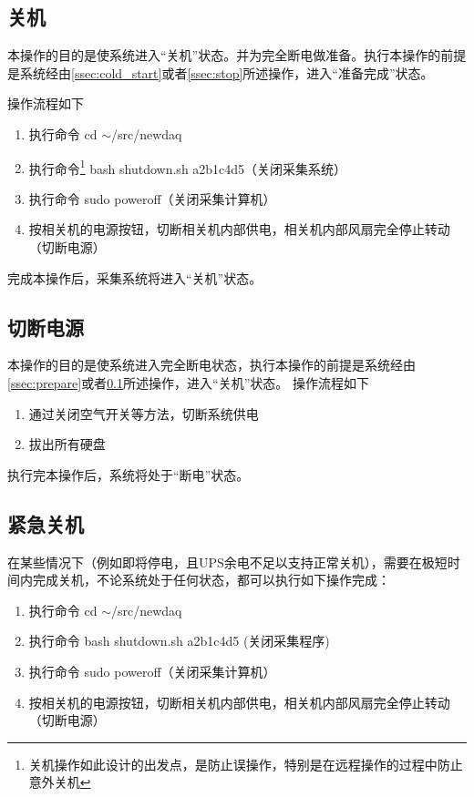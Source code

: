 \documentclass[11pt,includemp,a4paper]{article}
\begin{document}
\subsection{关机}
\label{ssec:shutdown}
本操作的目的是使系统进入“关机”状态。并为完全断电做准备。执行本操作的前提是系统经由\ref{ssec:cold_start}或者\ref{ssec:stop}所述操作，进入“准备完成”状态。

操作流程如下
\begin{enumerate}
    \item 执行命令 cd $\sim$/src/newdaq
    \item 执行命令\footnote{关机操作如此设计的出发点，是防止误操作，特别是在远程操作的过程中防止意外关机} bash shutdown.sh a2b1c4d5（关闭采集系统）
    \item 执行命令 sudo poweroff（关闭采集计算机）
    \item 按相关机的电源按钮，切断相关机内部供电，相关机内部风扇完全停止转动（切断电源）
\end{enumerate}
完成本操作后，采集系统将进入“关机”状态。

\subsection{切断电源}
\label{ssec:cut_power}
本操作的目的是使系统进入完全断电状态，执行本操作的前提是系统经由\ref{ssec:prepare}或者\ref{ssec:shutdown}所述操作，进入“关机”状态。
操作流程如下
\begin{enumerate}
    \item 通过关闭空气开关等方法，切断系统供电
    \item 拔出所有硬盘
\end{enumerate}
执行完本操作后，系统将处于“断电”状态。

\subsection{紧急关机}
在某些情况下（例如即将停电，且UPS余电不足以支持正常关机），需要在极短时间内完成关机，不论系统处于任何状态，都可以执行如下操作完成：
\begin{enumerate}
    \item 执行命令 cd $\sim$/src/newdaq
    \item 执行命令 bash shutdown.sh a2b1c4d5 (关闭采集程序)
    \item 执行命令 sudo poweroff（关闭采集计算机）
    \item 按相关机的电源按钮，切断相关机内部供电，相关机内部风扇完全停止转动（切断电源）
\end{enumerate}
\end{document}

